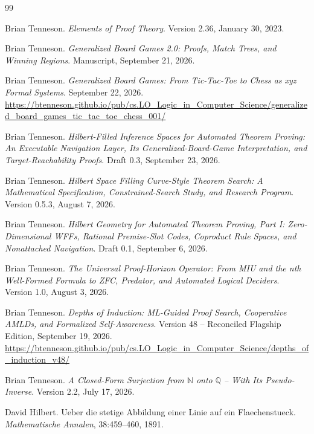 \documentclass[11pt]{article}
\theoremstyle{definition}
\newcommand{\N}{\mathbb N}
\newcommand{\Q}{\mathbb Q}
\begin{document}
\begin{thebibliography}{99}

Brian Tenneson.
\newblock \emph{Elements of Proof Theory}.
\newblock Version 2.36, January 30, 2023.

Brian Tenneson.
\newblock \emph{Generalized Board Games 2.0: Proofs, Match Trees, and Winning Regions}.
\newblock Manuscript, September 21, 2026.

Brian Tenneson.
\newblock \emph{Generalized Board Games: From Tic-Tac-Toe to Chess as xyz Formal Systems}.
\newblock September 22, 2026.
\newblock \url{https://btenneson.github.io/pub/cs.LO_Logic_in_Computer_Science/generalized_board_games_tic_tac_toe_chess_001/}

Brian Tenneson.
\newblock \emph{Hilbert-Filled Inference Spaces for Automated Theorem Proving: An Executable Navigation Layer, Its Generalized-Board-Game Interpretation, and Target-Reachability Proofs}.
\newblock Draft 0.3, September 23, 2026.

Brian Tenneson.
\newblock \emph{Hilbert Space Filling Curve-Style Theorem Search: A Mathematical Specification, Constrained-Search Study, and Research Program}.
\newblock Version 0.5.3, August 7, 2026.

Brian Tenneson.
\newblock \emph{Hilbert Geometry for Automated Theorem Proving, Part I: Zero-Dimensional WFFs, Rational Premise-Slot Codes, Coproduct Rule Spaces, and Nonattached Navigation}.
\newblock Draft 0.1, September 6, 2026.

Brian Tenneson.
\newblock \emph{The Universal Proof-Horizon Operator: From MIU and the nth Well-Formed Formula to ZFC, Predator, and Automated Logical Deciders}.
\newblock Version 1.0, August 3, 2026.

Brian Tenneson.
\newblock \emph{Depths of Induction: ML-Guided Proof Search, Cooperative AMLDs, and Formalized Self-Awareness}.
\newblock Version 48 -- Reconciled Flagship Edition, September 19, 2026.
\newblock \url{https://btenneson.github.io/pub/cs.LO_Logic_in_Computer_Science/depths_of_induction_v48/}

Brian Tenneson.
\newblock \emph{A Closed-Form Surjection from $\N$ onto $\Q$ -- With Its Pseudo-Inverse}.
\newblock Version 2.2, July 17, 2026.

David Hilbert.
\newblock Ueber die stetige Abbildung einer Linie auf ein Flaechenstueck.
\newblock \emph{Mathematische Annalen}, 38:459--460, 1891.


\end{thebibliography}
\end{document}
